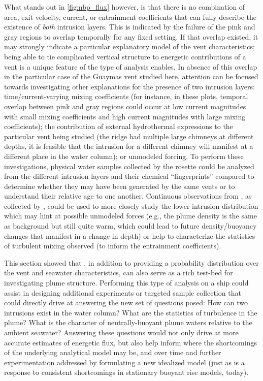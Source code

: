 What stands out in \cref{fig:nbp_flux} however, is that there is no combination of area, exit velocity, current, or entrainment coefficients that can fully describe the existence of \emph{both} intrusion layers. This is indicated by the failure of the pink and gray regions to overlap temporally for any fixed setting. If that overlap existed, it may strongly indicate a particular explanatory model of the vent characteristics; being able to tie complicated vertical structure to energetic contributions of a vent is a unique feature of the type of analysis \PHUMES enables. In absence of this overlap in the particular case of the Guaymas vent studied here, attention can be focused towards investigating other explanations for the presence of two intrusion layers: time/current-varying mixing coefficients (for instance, in these plots, temporal overlap between pink and gray regions could occur at low current magnitudes with small mixing coefficients and high current magnitudes with large mixing coefficients); the contribution of external hydrothermal expressions to the particular vent being studied (the ridge had multiple large chimneys at different depths, it is feasible that the intrusion for a different chimney will manifest at a different place in the water column); or unmodeled forcing. To perform these investigations, physical water samples collected by the rosette could be analyzed from the different intrusion layers and their chemical ``fingerprints'' compared to determine whether they may have been generated by the same vents or to understand their relative age to one another. Continuous observations from \Sentry, as collected by \PHORTEX, could be used to more closely study the lower-intrusion distribution which may hint at possible unmodeled forces (e.g., the plume density is the same as background but still quite warm, which could lead to future density/buoyancy changes that manifest in a change in depth) or help to characterize the statistics of turbulent mixing observed (to inform the entrainment coefficients).

This section showed that \PHUMES, in addition to providing a probability distribution over the vent and seawater characteristics, can also serve as a rich test-bed for investigating plume structure. Performing this type of analysis on a ship could assist in designing additional experiments or targeted sample collection that could directly drive at answering the new set of questions posed: How can two intrusions exist in the water column? What are the statistics of turbulence in the plume? What is the character of neutrally-buoyant plume waters relative to the ambient seawater? Answering these questions would not only drive at more accurate estimates of energetic flux, but also help inform where the shortcomings of the underlying analytical model may be, and over time and further experimentation addressed by formulating a new idealized model (just as \PHUMES is a response to consistent shortcomings in stationary buoyant rise models, today).


